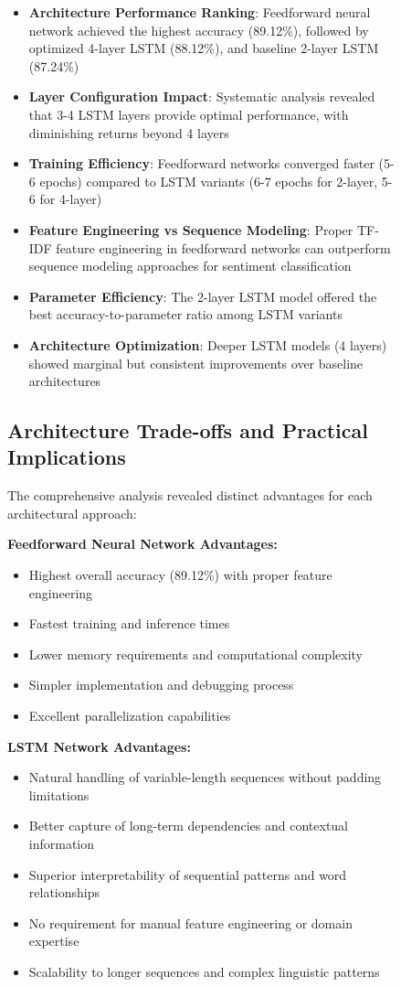\documentclass[a4paper, journal]{IEEEtran}
\begin{document}
\begin{figure}[!t]
\begin{itemize}
    \item \textbf{Architecture Performance Ranking}: Feedforward neural network achieved the highest accuracy (89.12\%), followed by optimized 4-layer LSTM (88.12\%), and baseline 2-layer LSTM (87.24\%)
    \item \textbf{Layer Configuration Impact}: Systematic analysis revealed that 3-4 LSTM layers provide optimal performance, with diminishing returns beyond 4 layers
    \item \textbf{Training Efficiency}: Feedforward networks converged faster (5-6 epochs) compared to LSTM variants (6-7 epochs for 2-layer, 5-6 for 4-layer)
    \item \textbf{Feature Engineering vs Sequence Modeling}: Proper TF-IDF feature engineering in feedforward networks can outperform sequence modeling approaches for sentiment classification
    \item \textbf{Parameter Efficiency}: The 2-layer LSTM model offered the best accuracy-to-parameter ratio among LSTM variants
    \item \textbf{Architecture Optimization}: Deeper LSTM models (4 layers) showed marginal but consistent improvements over baseline architectures
\end{itemize}

\subsection{Architecture Trade-offs and Practical Implications}

The comprehensive analysis revealed distinct advantages for each architectural approach:

\textbf{Feedforward Neural Network Advantages:}
\begin{itemize}
    \item Highest overall accuracy (89.12\%) with proper feature engineering
    \item Fastest training and inference times
    \item Lower memory requirements and computational complexity
    \item Simpler implementation and debugging process
    \item Excellent parallelization capabilities
\end{itemize}

\textbf{LSTM Network Advantages:}
\begin{itemize}
    \item Natural handling of variable-length sequences without padding limitations
    \item Better capture of long-term dependencies and contextual information
    \item Superior interpretability of sequential patterns and word relationships
    \item No requirement for manual feature engineering or domain expertise
    \item Scalability to longer sequences and complex linguistic patterns
\end{itemize}


\end{figure}
\end{document}
